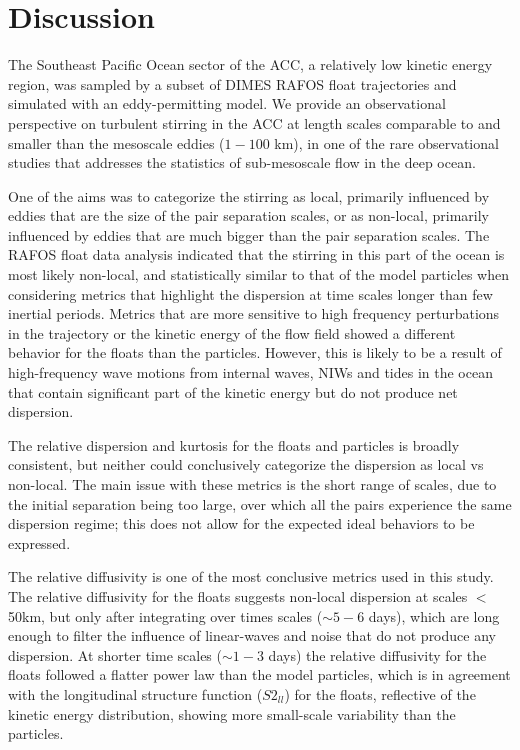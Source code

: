 \documentclass[]{ametsoc}
\begin{document}
\section{Discussion} 
The Southeast Pacific Ocean sector of the ACC, a relatively low kinetic energy region, was sampled by a subset of DIMES RAFOS float trajectories and simulated with an eddy-permitting model. We provide an observational perspective on turbulent stirring in the ACC at length scales comparable to and smaller than the mesoscale eddies ($1 - 100$ km), in one of the rare observational studies that addresses the statistics of sub-mesoscale flow in the deep ocean.  

One of the aims was to categorize the stirring as local, primarily influenced by eddies that are the size of the pair separation scales, or as non-local, primarily influenced by eddies that are much bigger than the pair separation scales. The RAFOS float data analysis indicated that the stirring in this part of the ocean is most likely non-local, and statistically similar to that of the model particles when considering metrics that highlight the dispersion at time scales longer than few inertial periods. Metrics that are more sensitive to high frequency perturbations in the trajectory or the kinetic energy of the flow field showed a different behavior for the floats than the particles. However, this is likely to be a result of high-frequency wave motions from internal waves, NIWs and tides in the ocean that contain significant part of the kinetic energy but do not produce net dispersion.

The relative dispersion and kurtosis for the floats and particles is broadly consistent, but neither could conclusively categorize the dispersion as local vs non-local. The main issue with these metrics is the short range of scales, due to the initial separation being too large, over which all the pairs experience the same dispersion regime; this does not allow for the expected ideal behaviors to be expressed.

The relative diffusivity is one of the most conclusive metrics used in this study. The relative diffusivity for the floats suggests non-local dispersion at scales $<$50km, but only after integrating over times scales ($\sim 5-6$ days), which are long enough to filter the influence of linear-waves and noise that do not produce any dispersion. At shorter time scales ($\sim 1-3$ days) the relative diffusivity for the floats followed a flatter power law than the model particles, which is in agreement with the longitudinal structure function ($S2_{ll}$) for the floats, reflective of the kinetic energy distribution, showing more small-scale variability than the particles. 
\end{document}
